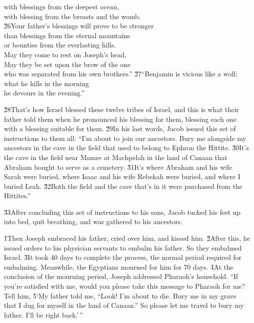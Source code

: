 \begin{poetry}
\poemll    with blessings from the deepest ocean, \\
\poeml with blessing from the breasts and the womb. \\
\poeml \v{26}Your father's blessings will prove to be stronger \\
\poemll    than blessings from the eternal mountains \\
\poemlll       or bounties from the everlasting hills. \\
\poeml May they come to rest on Joseph's head, \\
\poemll    May they be set upon the brow of the one \\
\poemlll       who was separated from his own brothers.''
\poeml \v{27}``Benjamin is vicious like a wolf; \\
\poemll    what he kills in the morning \\
\poemlll       he devours in the evening.''
\end{poetry}

\v{28}That's how Israel blessed these twelve tribes of Israel, and this is what their father told them when he pronounced his blessing for them, blessing each one with a blessing suitable for them. \v{29}In his last words, Jacob issued this set of instructions to them all: ``I'm about to join our ancestors. Bury me alongside my ancestors in the cave in the field that used to belong to Ephron the Hittite. \v{30}It's the cave in the field near Mamre at Machpelah in the land of Canaan that Abraham bought to serve as a cemetery. \v{31}It's where Abraham and his wife Sarah were buried, where Isaac and his wife Rebekah were buried, and where I buried Leah. \v{32}Both the field and the cave that's in it were purchased from the Hittites.''

\v{33}After concluding this set of instructions to his sons, Jacob tucked his feet up into bed, quit breathing, and was gathered to his ancestors.

\v{1}Then Joseph embraced his father, cried over him, and kissed him. \v{2}After this, he issued orders to his physician servants to embalm his father. So they embalmed Israel. \v{3}It took 40 days to complete the process, the normal period required for embalming. Meanwhile, the Egyptians mourned for him for 70 days. \v{4}At the conclusion of the mourning period, Joseph addressed Pharaoh's household. ``If you're satisfied with me, would you please take this message to Pharaoh for me? Tell him, \v{5}`My father told me, ``Look! I'm about to die. Bury me in my grave that I dug for myself in the land of Canaan.'' So please let me travel to bury my father. I'll be right back.'\,''

